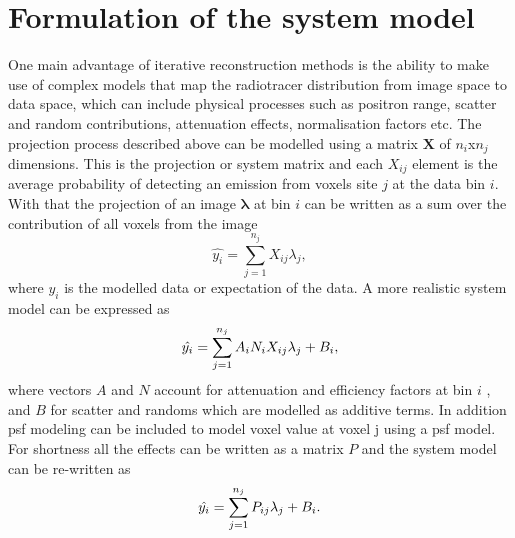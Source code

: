 \section{Formulation of the system model}
One main advantage of iterative reconstruction methods is the ability to make use of complex models that map the radiotracer distribution from image space to data space, which can include physical processes such as positron range, scatter and random contributions, attenuation effects, normalisation factors etc.
The projection process described above can be modelled using a matrix $\bm{X}$ of $n_i$x$n_j$ dimensions. This is the projection or system matrix and each ${X}_{ij}$ element is the average probability of detecting an emission from voxels site $j$ at the data bin $i$. With that the projection of an image $\bm{\lambda}$ at bin $i$ can be written as a sum over the contribution of all voxels from the image
\begin{equation}
   \hat{y_i} = \sum_{j=1}^{n_j} X_{ij} \lambda_j  ,
\end{equation}
where $\hat{y_i}$ is the modelled data or expectation of the data.  A more realistic system model can be expressed as 
\begin{equation}
   \hat{y_i} = \sum_{j=1}^{n_j} A_{i}N_{i}X_{ij} \lambda_j + B_{i} \\,
\end{equation}
where vectors $A$ and $N$ account for attenuation and efficiency factors at bin $i$ , and $B$ for scatter and randoms which are modelled as additive terms. In addition \gls{psf} modeling can be included to model voxel value at voxel j using a \gls{psf} model. 
For shortness all the effects can be written as a matrix $P$ and the system model can be re-written as
\begin{equation}
   \hat{y_i} = \sum_{j=1}^{n_j} P_{ij} \lambda_j + B_{i} \\.
   \label{eqn:system_model}
\end{equation}

